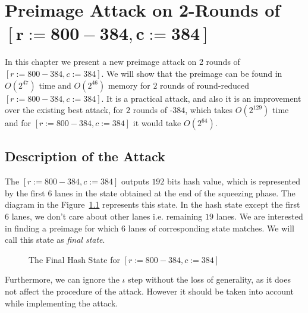 \chapter{Preimage Attack on 2-Rounds of \KECCAK{}$\mathbf{[r:=800-384, c:=384]}$}

In this chapter we present a new preimage attack on 2 rounds of \KECCAK{}$[r:=800-384, c:=384]$. We will show that the preimage can be found in $O(2^{47})$ time and $O(2^{46})$ memory for $2$ rounds of round-reduced \KECCAK{}$[r:=800-384, c:=384]$. It is a practical attack, and also it is an improvement over the existing best attack, for $2$ rounds of \Keccak-$384$, which takes $O(2^{129})$ time~\cite{guo2016linear} and for \KECCAK{}$[r:=800-384, c:=384]$ it would take $O(2^{64})$.

\section{Description of the Attack}
The \KECCAK{}$[r:=800-384, c:=384]$ outputs $192$ bits hash value, which is represented by the first $6$ lanes in the state obtained at the end of the squeezing phase. The diagram in the Figure~\ref{initial_sq} represents this state. In the hash state except the first $6$ lanes, we don't care about other lanes i.e. remaining $19$ lanes. We are interested in finding a preimage for which $6$ lanes of corresponding state matches. We will call this state as \emph{final state}.
\begin{figure}[ht]
\begin{center}
\end{center}
\caption{The Final Hash State for \KECCAK{}$[r:=800-384, c:=384]$ \label{initial_sq}}
\end{figure}
Furthermore, we can ignore the {$\iota$} step without the loss of generality, as it does not affect the procedure of the attack. However it should be taken into account while implementing the attack.

